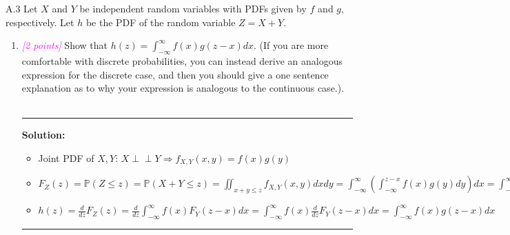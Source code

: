 \documentclass{article}
\newcommand{\1}{\mathbf{1}}
\renewcommand{\P}{\mathbb{P}}
\newcommand{\ind}{\perp\!\!\!\perp}
\newcommand{\points}[1]{\small\textcolor{magenta}{\emph{[#1 points]}} \normalsize}
\begin{document}
A.3 Let $X$ and $Y$ be independent random variables with PDFs given by $f$ and $g$, respectively. Let $h$ be the PDF of the random variable $Z = X+Y$.
\begin{enumerate}
	\item \points{2} Show that $h(z) = \int_{-\infty}^\infty f(x) g( z - x ) d x $.  (If you are more comfortable with discrete probabilities, you can instead derive an analogous expression for the discrete case,  and then you should give a one sentence explanation as to why your expression is analogous to the continuous case.).
	\\
    \\
    \noindent\rule{\textwidth}{1pt}
    {\bf Solution:}\\
    \begin{itemize}
        \item Joint PDF of $X,Y$: $X \ind Y \Rightarrow f_{X,Y}(x,y) = f(x)g(y)$
        \item $F_Z(z) = \P(Z\le z) = \P(X+Y \le z) = \iint_{x+y \le z} f_{X,Y}(x,y)dx dy = \int_{-\infty}^{\infty}\left(\int_{-\infty}^{z-x} f(x)g(y)dy\right)dx = \int_{-\infty}^{\infty}f(x)\left(\int_{-\infty}^{z-x} g(y)dy\right)dx =  \int_{-\infty}^{\infty}f(x)F_Y(z-x)dx$
        \item $h(z) = \frac{d}{dz} F_Z(z) = \frac{d}{dz}\int_{-\infty}^{\infty}f(x)F_Y(z-x)dx = \int_{-\infty}^{\infty}f(x)\frac{d}{dz}F_Y(z-x)dx = \int_{-\infty}^{\infty}f(x)g(z-x)dx \qquad \Box$
    \end{itemize}


    \noindent\rule{\textwidth}{1pt}
	

\end{enumerate}
\end{document}
